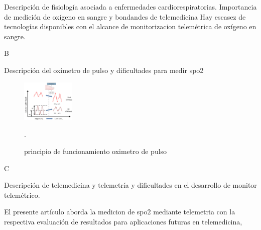 \documentclass[journal]{IEEEtran}
\begin{document}
Descripción de fisiología asociada a enfermedades cardiorespiratorias.
Importancia de medición de oxígeno en sangre y bondandes de telemedicina
Hay escasez de tecnologías disponibles con el alcance de monitorizacion telemétrica de oxígeno en sangre.

{\color{blue}B}

Descripción del oxímetro de pulso y dificultades para medir spo2

\begin{figure}[!h]
	\centering
	\includegraphics[width=1in]{principio_funcionamiento.png}
	\caption{principio de funcionamiento oximetro de pulso \cite{physiobank} }.
	
	\label{imagen_ecg}
\end{figure}
{\color{blue}C}

Descripción de telemedicina y telemetría y dificultades en el desarrollo de monitor telemétrico.


El presente artículo aborda la medicion de spo2 mediante telemetria con la respectiva evaluación de resultados para aplicaciones futuras en telemedicina, 



\end{document}
